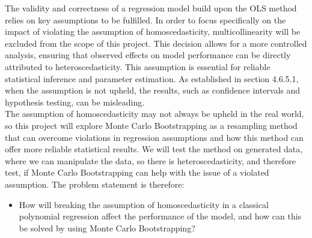 \label{sec:PBS}
The validity and correctness of a regression model build upon the OLS method relies on key assumptions to be fulfilled. In order to focus specifically on the impact of violating the assumption of homoscedasticity, multicollinearity will be excluded from the scope of this project. This decision allows for a more controlled analysis, ensuring that observed effects on model performance can be directly attributed to heteroscedasticity. This assumption is essential for reliable statistical inference and parameter estimation. As established in section 4.6.5.1, when the assumption is not upheld, the results, such as confidence intervals and hypothesis testing, can be misleading.\\
The assumption of homoscedasticity may not always be upheld in the real world, so this project will explore Monte Carlo Bootstrapping as a resampling method that can overcome violations in regression assumptions and how this method can offer more reliable statistical results. We will test the method on generated data, where we can manipulate the data, so there is heteroscedasticity, and therefore test, if Monte Carlo Bootstrapping can help with the issue of a violated assumption. The problem statement is therefore:



\begin{itemize}
	\item How will breaking the assumption of homoscedasticity in a classical polynomial regression affect the performance of the model, and how can this be solved by using Monte Carlo Bootstrapping?
\end{itemize}
